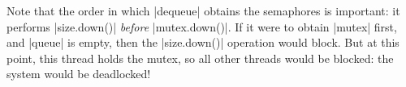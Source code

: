 
Note that the order in which |dequeue| obtains the semaphores is important: it
performs |size.down()| \emph{before} |mutex.down()|.  If it were to obtain
|mutex| first, and |queue| is empty, then the |size.down()| operation would
block.  But at this point, this thread holds the mutex, so all other threads
would be blocked: the system would be deadlocked!

